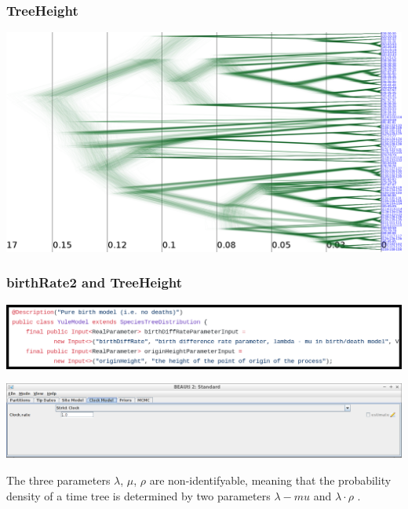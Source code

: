 \documentclass{beamer}
\begin{document}
\begin{frame}
  \frametitle{TreeHeight}

  \includegraphics[width=\textwidth]{densitree.png}

\end{frame}


\begin{frame}
  \frametitle{birthRate2 and TreeHeight}

  \includegraphics[width=\textwidth]{birthRate2_documentation.png}

  \includegraphics[width=\textwidth]{beauti_3.png}

  \begin{displayquote}
  The three parameters $\lambda$, $\mu$, $\rho$ are non-identifyable, meaning
  that the probability density of a time tree is determined by two parameters
  $\lambda - mu$ and $\lambda \cdot \rho$ \footnotemark.
  \end{displayquote}



\end{frame}
\end{document}
